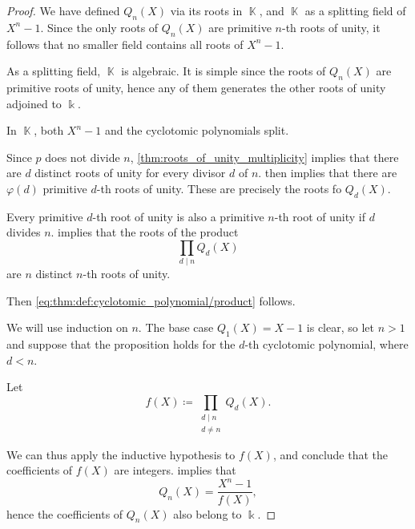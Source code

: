 \begin{proof}
   We have defined \( Q_n(X) \) via its roots in \( \BbbK \), and \( \BbbK \) as a splitting field of \( X^n - 1 \). Since the only roots of \( Q_n(X) \) are primitive \( n \)-th roots of unity, it follows that no smaller field contains all roots of \( X^n - 1 \).

   As a splitting field, \( \BbbK \) is algebraic. It is simple since the roots of \( Q_n(X) \) are primitive roots of unity, hence any of them generates the other roots of unity adjoined to \( \Bbbk \).

   In \( \BbbK \), both \( X^n - 1 \) and the cyclotomic polynomials split.

  Since \( p \) does not divide \( n \), \cref{thm:roots_of_unity_multiplicity} implies that there are \( d \) distinct roots of unity for every divisor \( d \) of \( n \).  then implies that there are \( \varphi(d) \) primitive \( d \)-th roots of unity. These are precisely the roots fo \( Q_d(X) \).

  Every primitive \( d \)-th root of unity is also a primitive \( n \)-th root of unity if \( d \) divides \( n \).  implies that the roots of the product
  \begin{equation*}
    \prod_{d \mid n} Q_d(X)
  \end{equation*}
  are \( n \) distinct \( n \)-th roots of unity.

  Then \eqref{eq:thm:def:cyclotomic_polynomial/product} follows.

   We will use induction on \( n \). The base case \( Q_1(X) = X - 1 \) is clear, so let \( n > 1 \) and suppose that the proposition holds for the \( d \)-th cyclotomic polynomial, where \( d < n \).

  Let
  \begin{equation}\label{eq:thm:def:cyclotomic_polynomial/coefficients/proof/step}
    f(X) \coloneqq \prod_{\substack{d \mid n \\ d \neq n}} Q_d(X).
  \end{equation}

  We can thus apply the inductive hypothesis to \( f(X) \), and conclude that the coefficients of \( f(X) \) are integers.  implies that
  \begin{equation*}
    Q_n(X) = \frac {X^n - 1} {f(X)},
  \end{equation*}
  hence the coefficients of \( Q_n(X) \) also belong to \( \Bbbk \).


\end{proof}
